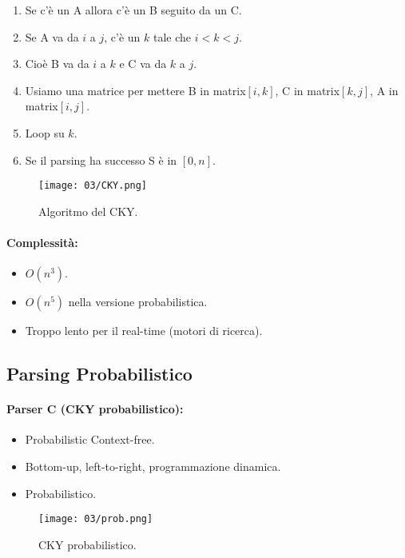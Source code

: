 \begin{enumerate}
  \item Se c'è un A allora c'è un B seguito da un C. 
  \item Se A va da $i$ a $j$, c'è un $k$ tale che $i < k < j$. 
  \item Cioè B va da $i$ a $k$ e C va da $k$ a $j$. 
  \item Usiamo una matrice per mettere B in matrix$[i,k]$, C in matrix$[k,j]$, A in matrix$[i,j]$. 
  \item Loop su $k$. 
  \item Se il parsing ha successo S è in $[0, n]$.
\end{enumerate}

\begin{figure}[!h]
    \centering
    \texttt{[image: 03/CKY.png]}
    \caption{Algoritmo del CKY.}
\end{figure}

\paragraph{Complessità:}

\begin{itemize}
  \item $O(n^3)$. 
  \item $O(n^5)$ nella versione probabilistica. 
  \item Troppo lento per il real-time (motori di ricerca). 
\end{itemize}

\subsection{Parsing Probabilistico}

\paragraph{Parser C (CKY probabilistico):}

\begin{itemize}
  \item Probabilistic Context-free. 
  \item Bottom-up, left-to-right, programmazione dinamica. 
  \item Probabilistico.
\end{itemize}

\begin{figure}[!h]
    \centering
    \texttt{[image: 03/prob.png]}
    \caption{CKY probabilistico.}
\end{figure}

